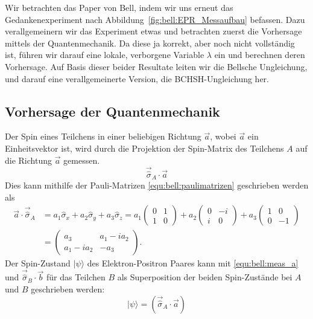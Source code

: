 \begin{refsection}
Wir betrachten das Paper von Bell, indem wir uns erneut das Gedankenexperiment 
nach Abbildung~\ref{fig:bell:EPR_Messaufbau} befassen.
Dazu verallgemeinern wir das Experiment etwas und betrachten zuerst die
Vorhersage mittels der Quantenmechanik.
Da diese ja korrekt, aber noch nicht vollst\"andig ist, f\"uhren wir darauf
eine lokale, verborgene Variable $\lambda$ ein und berechnen deren Vorhersage.
Auf Basis dieser beider Resultate leiten wir die Bellsche Ungleichung, und
darauf eine verallgemeinerte Version, die BCHSH-Ungleichung her.

\subsection{Vorhersage der Quantenmechanik}
Der Spin eines Teilchens in einer beliebigen Richtung $\vec{a}$, wobei $\vec{a}$
ein Einheitsvektor ist, wird durch die
Projektion der Spin-Matrix des Teilchens $A$ auf die 
Richtung $\vec{a}$ gemessen.
\begin{equation}\label{equ:bell:meas_a}
    \vec{\hat{\sigma}}_A \cdot \vec{a}
\end{equation}
Dies kann mithilfe der Pauli-Matrizen \eqref{equ:bell:paulimatrizen} geschrieben
werden als
\begin{align}
    \vec{a} \cdot \vec{\hat{\sigma}}_A &= 
    a_1 \hat{\sigma}_x + a_2 \hat{\sigma}_y + a_3 \hat{\sigma}_z = 
    a_1 \begin{pmatrix} 0 & 1 \\ 1 & 0 \end{pmatrix} +
    a_2 \begin{pmatrix} 0 & -i \\ i & 0 \end{pmatrix} + 
    a_3 \begin{pmatrix} 1 & 0 \\ 0 & -1 \end{pmatrix} \\
    & = \begin{pmatrix}
       a_3 & a_1 - i a_2 \\
       a_1 - i a_2 & -a_3
    \end{pmatrix}. \label{equ:bell:proj_a_s}
\end{align}
Der Spin-Zustand $|\psi\rangle$ des Elektron-Positron Paares kann mit
\eqref{equ:bell:meas_a} und $\vec{\hat{\sigma}}_B \cdot \vec{b}$ 
f\"ur das Teilchen $B$ als Superposition der beiden
Spin-Zust\"ande bei $A$ und $B$ geschrieben werden:
\begin{equation}
    |\psi\rangle = \left( \vec{\hat{\sigma}}_A \cdot \vec{a} \right)

\end{equation}
\end{refsection}
